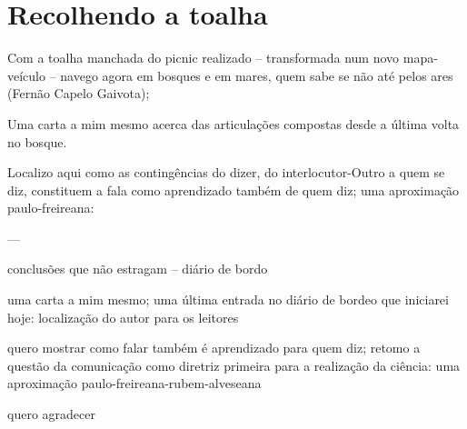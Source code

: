 \chapter{Recolhendo a toalha}
\label{cap:recolhida}

Com a toalha manchada do picnic realizado -- transformada num novo mapa-veículo -- navego agora em bosques e em mares, quem sabe se não até pelos ares (Fernão Capelo Gaivota);

Uma carta a mim mesmo acerca das articulações compostas desde a última volta no bosque.

Localizo aqui como as contingências do dizer, do interlocutor-Outro a quem se diz, constituem a fala como aprendizado também de quem diz;
    uma aproximação paulo-freireana:

---

conclusões que não estragam -- diário de bordo

uma carta a mim mesmo;
    uma última entrada no diário de bordeo que iniciarei hoje:
        localização do autor para os leitores

quero mostrar como falar também é aprendizado para quem diz;
    retomo a questão da comunicação como diretriz primeira para a realização da ciência:
        uma aproximação paulo-freireana-rubem-alveseana

quero agradecer